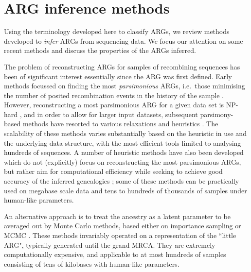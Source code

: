 \documentclass{article}
\begin{document}

\section*{ARG inference methods}
Using the terminology developed here to classify ARGs, we review methods developed
to \emph{infer} ARGs from sequencing data. We focus our attention on some recent methods and discuss the
properties of the ARGs inferred.

The problem of reconstructing ARGs for samples of recombining sequences has been of significant interest
essentially since the ARG was first defined. Early methods focussed on finding the most 
\emph{parsimonious} ARGs, i.e.\ those minimising the number of 
posited recombination events in the history of the sample \citep{hein1990reconstructing, song2003parsimonious,
lyngso2005minimum}. However, reconstructing a most parsimonious ARG for a given data set
is NP-hard \citep{wang2001perfect}, and in order to allow for larger input datasets,
subsequent parsimony-based methods have resorted to various relaxations and heuristics \citep{hein1993heuristic, 
song2005efficient, wu2008association, camara2016inference, thao2019hybrid, ignatieva2021kwarg}.
The scalability of these methods varies substantially based on the heuristic in use
and the underlying data structure, with the most efficient tools limited to analysing hundreds of sequences.
A number of heuristic methods have also been developed which do not (explicitly) focus on reconstructing
the most parsimonious ARGs, but rather aim for computational efficiency
while seeking to achieve good accuracy of the inferred genealogies
\citep{minichiello2006mapping, parida2008estimating, wu2011new, mirzaei2017rent}; some of these methods \citep{kelleher2019inferring, speidel2019method, zhang2021biobank} can be practically
used on megabase scale data and tens to hundreds of thousands of samples under human-like
parameters.

An alternative approach is to treat the ancestry as a latent parameter to be averaged out
by Monte Carlo methods, based either on importance sampling
\citep{griffiths1996ancestral, fearnhead2001estimating, jenkins2011inference}
or MCMC \citep{kuhner2000maximum, nielsen2000estimation, wang2008bayesian, fallon2013acg}.
These methods invariably operated on a representation of the ``little ARG", typically
generated until the grand MRCA. They are extremely computationally expensive,
and applicable to at most hundreds of samples consisting of tens of kilobases with
human-like parameters.
\end{document}
